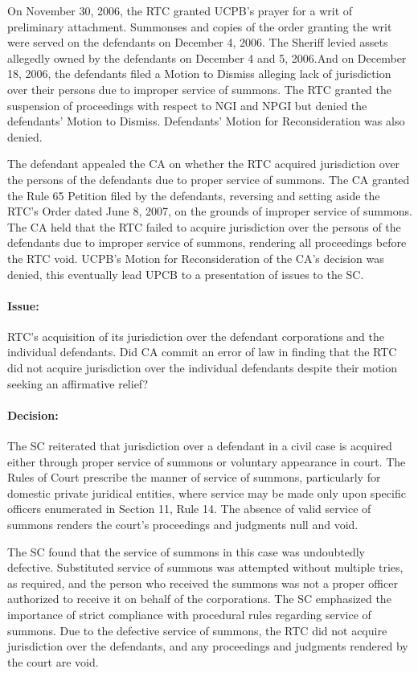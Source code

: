 \documentclass[
12pt,
oneside,
onehalfspacing,
headsepline
]{DigestCollection}
\begin{document}
On November 30, 2006, the RTC granted UCPB's prayer for a writ of preliminary attachment. Summonses and copies of the order granting the writ were served on the defendants on December 4, 2006. The Sheriff levied assets allegedly owned by the defendants on December 4 and 5, 2006.And on December 18, 2006, the defendants filed a Motion to Dismiss alleging lack of jurisdiction over their persons due to improper service of summons. The RTC granted the suspension of proceedings with respect to NGI and NPGI but denied the defendants' Motion to Dismiss. Defendants' Motion for Reconsideration was also denied.

The defendant appealed the CA on whether the RTC acquired jurisdiction over the persons of the defendants due to proper service of summons. The CA granted the Rule 65 Petition filed by the defendants, reversing and setting aside the RTC's Order dated June 8, 2007, on the grounds of improper service of summons. The CA held that the RTC failed to acquire jurisdiction over the persons of the defendants due to improper service of summons, rendering all proceedings before the RTC void. UCPB's Motion for Reconsideration of the CA's decision was denied, this eventually lead UPCB to a presentation of issues to the SC.

\paragraph{Issue:}

RTC's acquisition of its jurisdiction over the defendant corporations and the individual defendants. Did CA commit an error of law in finding that the RTC did not acquire jurisdiction over the individual defendants despite their motion seeking an affirmative relief?

\paragraph{Decision:}

The SC reiterated that jurisdiction over a defendant in a civil case is acquired either through proper service of summons or voluntary appearance in court. The Rules of Court prescribe the manner of service of summons, particularly for domestic private juridical entities, where service may be made only upon specific officers enumerated in Section 11, Rule 14. The absence of valid service of summons renders the court's proceedings and judgments null and void.

The SC found that the service of summons in this case was undoubtedly defective. Substituted service of summons was attempted without multiple tries, as required, and the person who received the summons was not a proper officer authorized to receive it on behalf of the corporations. The SC emphasized the importance of strict compliance with procedural rules regarding service of summons. Due to the defective service of summons, the RTC did not acquire jurisdiction over the defendants, and any proceedings and judgments rendered by the court are void.
\end{document}
